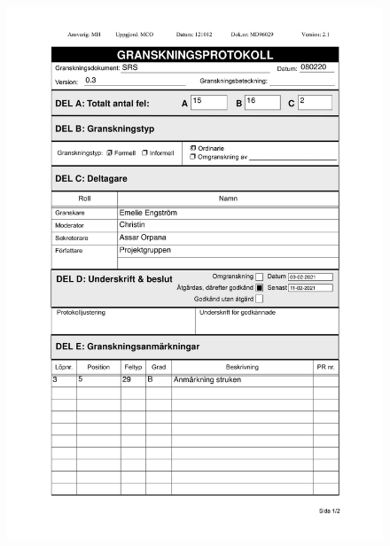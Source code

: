 \documentclass{article}
\begin{document}
 
\begin{figure}
     \centering
     \includegraphics[width=13cm]{images/SRS - Granskningsprotokoll-1}
     \renewcommand\figurename{Figure}
     \label{fig:my_label}
 \end{figure}
 
\end{document}
